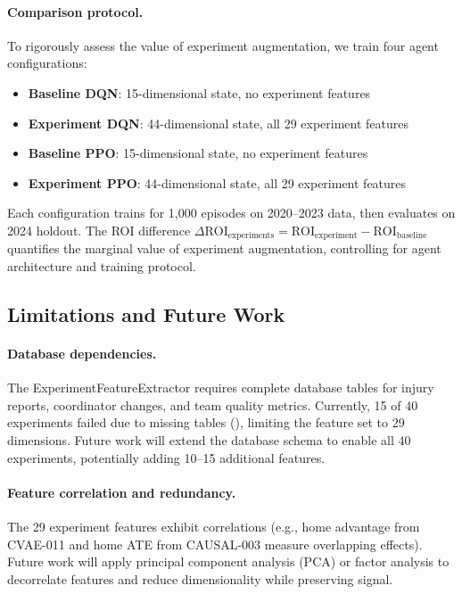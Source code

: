 \paragraph{Comparison protocol.}
To rigorously assess the value of experiment augmentation, we train four agent configurations:
\begin{itemize}
  \item \textbf{Baseline DQN}: 15-dimensional state, no experiment features
  \item \textbf{Experiment DQN}: 44-dimensional state, all 29 experiment features
  \item \textbf{Baseline PPO}: 15-dimensional state, no experiment features
  \item \textbf{Experiment PPO}: 44-dimensional state, all 29 experiment features
\end{itemize}

Each configuration trains for 1,000 episodes on 2020--2023 data, then evaluates on 2024 holdout. The ROI difference $\Delta \text{ROI}_{\text{experiments}} = \text{ROI}_{\text{experiment}} - \text{ROI}_{\text{baseline}}$ quantifies the marginal value of experiment augmentation, controlling for agent architecture and training protocol.

\subsection{Limitations and Future Work}

\paragraph{Database dependencies.}
The ExperimentFeatureExtractor requires complete database tables for injury reports, coordinator changes, and team quality metrics. Currently, 15 of 40 experiments failed due to missing tables (), limiting the feature set to 29 dimensions. Future work will extend the database schema to enable all 40 experiments, potentially adding 10--15 additional features.

\paragraph{Feature correlation and redundancy.}
The 29 experiment features exhibit correlations (e.g., home advantage from CVAE-011 and home ATE from CAUSAL-003 measure overlapping effects). Future work will apply principal component analysis (PCA) or factor analysis to decorrelate features and reduce dimensionality while preserving signal.

